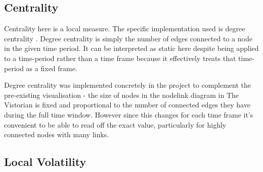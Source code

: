 \subsection{Centrality}
Centrality here is a local measure. The specific implementation used is degree centrality \cite{degCent}. Degree centrality is simply the number of edges connected to a node in the given time period. It can be interpreted as static here despite being applied to a time-period rather than a time frame because it effectively treats that time-period as a fixed frame.

Degree centrality was implemented concretely in the project to complement the pre-existing visualisation - the size of nodes in the nodelink diagram in The Vistorian is fixed and proportional to the number of connected edges they have during the full time window. However since this changes for each time frame it's convenient to be able to read off the exact value, particularly for highly connected nodes with many links.





\subsection{Local Volatility}

